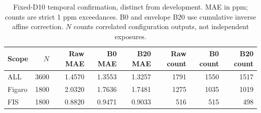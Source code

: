 \begin{table}[H]\centering\small
\caption{Fixed-D10 temporal confirmation, distinct from development. MAE in ppm; counts are strict 1 ppm exceedances. B0 and envelope B20 use cumulative inverse affine correction. $N$ counts correlated configuration outputs, not independent exposures.}\label{tab:c5primary}
\setlength{\tabcolsep}{4pt}\begin{tabular}{lrrrrrrr}
\toprule
Scope & $N$ & Raw MAE & B0 MAE & B20 MAE & Raw count & B0 count & B20 count \\ \midrule
ALL & 3600 & 1.4570 & 1.3553 & 1.3257 & 1791 & 1550 & 1517 \\
Figaro & 1800 & 2.0320 & 1.7636 & 1.7481 & 1275 & 1035 & 1019 \\
FIS & 1800 & 0.8820 & 0.9471 & 0.9033 & 516 & 515 & 498 \\
\bottomrule\end{tabular}\end{table}
